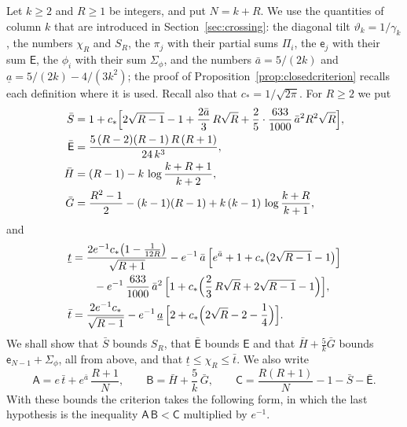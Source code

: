 \documentclass{amsart}
\theoremstyle{definition}
\theoremstyle{remark}
\numberwithin{equation}{section}
\begin{document}
Let $k\ge 2$ and $R\ge 1$ be integers, and put $N=k+R$. We use the quantities of column $k$ that are introduced in Section~\ref{sec:crossing}: the diagonal tilt $\vartheta_k=1/\gamma_k$, the numbers $\chi_R$ and $S_R$, the $\pi_j$ with their partial sums $\Pi_i$, the $\mathsf e_j$ with their sum $\mathsf E$, the $\phi_i$ with their sum $\Sigma_\phi$, and the numbers $\bar a=5/(2k)$ and $\underline a=5/(2k)-4/(3k^2)$; the proof of Proposition~\ref{prop:closedcriterion} recalls each definition where it is used. Recall also that $c_\ast=1/\sqrt{2\pi}$. For $R\ge 2$ we put
\begin{equation}\label{eq:strip-upper}
\begin{aligned}
\bar S&=1+c_\ast\Bigl[2\sqrt{R-1}-1+\frac{2\bar a}{3}\,R\sqrt R+\frac25\cdot\frac{633}{1000}\,\bar a^{2}R^{2}\sqrt R\Bigr],\\
\bar{\mathsf E}&=\frac{5\,(R-2)(R-1)\,R\,(R+1)}{24\,k^{3}},\\
\bar H&=(R-1)-k\,\log\frac{k+R+1}{k+2},\\
\bar G&=\frac{R^{2}-1}{2}-(k-1)(R-1)+k\,(k-1)\,\log\frac{k+R}{k+1},
\end{aligned}
\end{equation}
and
\begin{equation}\label{eq:strip-deficit}
\begin{aligned}
\underline t&=\frac{2e^{-1}c_\ast\bigl(1-\frac{1}{12R}\bigr)}{\sqrt{R+1}}-e^{-1}\,\bar a\,\Bigl[e^{\bar a}+1+c_\ast\bigl(2\sqrt{R-1}-1\bigr)\Bigr]\\
&\qquad-e^{-1}\,\frac{633}{1000}\,\bar a^{2}\,\Bigl[1+c_\ast\Bigl(\frac23\,R\sqrt R+2\sqrt{R-1}-1\Bigr)\Bigr],\\
\bar t&=\frac{2e^{-1}c_\ast}{\sqrt{R-1}}-e^{-1}\,\underline a\,\Bigl[2+c_\ast\Bigl(2\sqrt R-2-\frac14\Bigr)\Bigr].
\end{aligned}
\end{equation}
We shall show that $\bar S$ bounds $S_R$, that $\bar{\mathsf E}$ bounds $\mathsf E$ and that $\bar H+\frac5k\bar G$ bounds $\mathsf e_{N-1}+\Sigma_\phi$, all from above, and that $\underline t\le\chi_R\le\bar t$. We also write
\begin{equation}\label{eq:strip-three}
\mathsf{A}=e\,\bar t+e^{\bar a}\,\frac{R+1}{N},\qquad\mathsf{B}=\bar H+\frac5k\,\bar G,\qquad\mathsf{C}=\frac{R(R+1)}{N}-1-\bar S-\bar{\mathsf E}.
\end{equation}
With these bounds the criterion takes the following form, in which the last hypothesis is the inequality $\mathsf{A}\,\mathsf{B}<\mathsf{C}$ multiplied by $e^{-1}$.
\end{document}
